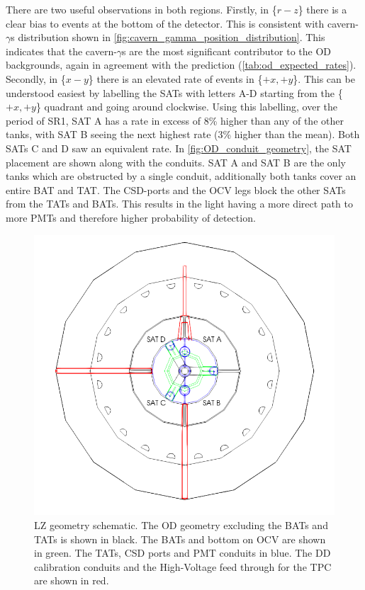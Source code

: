 

\par
There are two useful observations in both regions.
Firstly, in \{$r-z$\} there is a clear bias to events at the bottom of the detector.
This is consistent with cavern-$\gamma$s distribution shown in \autoref{fig:cavern_gamma_position_distribution}.
This indicates that the cavern-$\gamma$s are the most significant contributor to the OD backgrounds, again in agreement with the prediction (\autoref{tab:od_expected_rates}).
Secondly, in \{$x-y$\} there is an elevated rate of events in \{$+x,+y$\}.
This can be understood easiest by labelling the SATs with letters A-D starting from the \{$+x,+y$\} quadrant and going around clockwise.
Using this labelling, over the period of SR1, SAT A has a rate in excess of 8\% higher than any of the other tanks, with SAT B seeing the next highest rate (3\% higher than the mean).
Both SATs C and D saw an equivalent rate.
In \autoref{fig:OD_conduit_geometry}, the SAT placement are shown along with the conduits.
SAT A and SAT B are the only tanks which are obstructed by a single conduit, additionally both tanks cover an entire BAT and TAT.
The CSD-ports and the OCV legs block the other SATs from the TATs and BATs.
This results in the light having a more direct path to more PMTs and therefore higher probability of detection.

\begin{figure}[]
\includegraphics[width=\textwidth]{Figures/Geometry/geometry_with_conduits.png}
\centering
\caption{LZ geometry schematic. The OD geometry excluding the BATs and TATs is shown in black. The BATs and bottom on OCV are shown in green. The TATs, CSD ports and PMT conduits in blue. The DD calibration conduits and the High-Voltage feed through for the TPC are shown in red.}
\label{fig:OD_conduit_geometry}
\end{figure}


